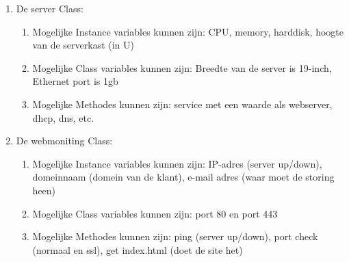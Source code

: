 \begin{enumerate}
\item De server Class:
	\begin{enumerate}
	\item Mogelijke Instance variables kunnen zijn: CPU, memory, harddisk, hoogte van de serverkast (in U)
	\item Mogelijke	Class variables kunnen zijn: Breedte van de server is 19-inch, Ethernet port is 1gb
	\item Mogelijke Methodes kunnen zijn: service met een waarde als webserver, dhcp, dns, etc.
	\end{enumerate}

\item De webmoniting Class:
	\begin{enumerate}
	\item Mogelijke Instance variables kunnen zijn: IP-adres (server up/down), domeinnaam (domein van de klant), e-mail adres (waar moet de storing heen)
	\item Mogelijke	Class variables kunnen zijn: port 80 en port 443
	\item Mogelijke Methodes kunnen zijn: ping (server up/down), port check (normaal en ssl), get index.html (doet de site het)
	\end{enumerate}
\end{enumerate}

